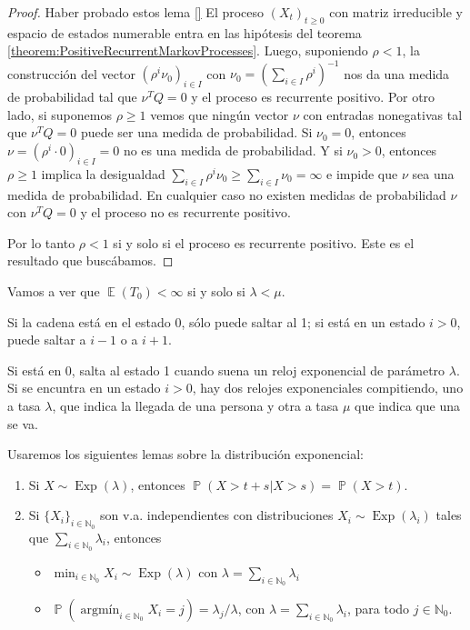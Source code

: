 \documentclass{article}
\DeclareMathOperator{\prob}{\mathbb{P}}
\DeclareMathOperator{\Exp}{\mathbb{E}}
\DeclareMathOperator{\Exponential}{\text{Exp}}
\DeclareMathOperator*{\argmin}{\text{argmín}}
\newcommand{\naturalnum}{\mathbb{N}}
\theoremstyle{definition}
\begin{document}
\begin{proof}
\medskip
Haber probado estos lema \ref{}  El proceso \((X_t)_{t \geq 0}\) con matriz irreducible y espacio de estados numerable entra en las hipótesis del teorema \ref{theorem:PositiveRecurrentMarkovProcesses}.
Luego, suponiendo \(\rho < 1\), la construcción del vector \((\rho^i \nu_0)_{i \in I}\) con \(\nu_0 = \left(\sum_{i \in I} \rho^i\right)^{- 1}\) nos da una medida de probabilidad tal que \(\nu^T Q = 0\) y el proceso es recurrente positivo.
Por otro lado, si suponemos \(\rho \geq 1\) vemos que ningún vector \(\nu\) con entradas nonegativas tal que \(\nu^T Q = 0\) puede ser una medida de probabilidad.
Si \(\nu_0 = 0\), entonces \(\nu = (\rho^i \cdot 0)_{i \in I} = 0\) no es una medida de probabilidad.
Y si \(\nu_0 > 0\), entonces \(\rho \geq 1\) implica la desigualdad \(\sum_{i \in I} \rho^i \nu_0 \geq \sum_{i \in I} \nu_0 = \infty\) e impide que \(\nu\) sea una medida de probabilidad.
En cualquier caso no existen medidas de probabilidad \(\nu\) con \(\nu^T Q = 0\) y el proceso no es recurrente positivo.

Por lo tanto \(\rho < 1\) si y solo si el proceso es recurrente positivo.
Este es el resultado que buscábamos.
\end{proof}




Vamos a ver que \(\Exp(T_0) < \infty\) si y solo si \(\lambda < \mu\).

Si la cadena está en el estado 0, sólo puede saltar al 1; si está en un estado \(i > 0\), puede saltar a \(i - 1\) o a \(i + 1\).

Si está en 0, salta al estado 1 cuando suena un reloj exponencial de parámetro \(\lambda\).
Si se encuntra en un estado \(i > 0\), hay dos relojes exponenciales compitiendo, uno a tasa \(\lambda\), que indica la llegada de una persona y otra a tasa \(\mu\) que indica que una se va. 

Usaremos los siguientes lemas sobre la distribución exponencial:
\begin{enumerate}
	\item Si \(X \sim \Exponential(\lambda)\), entonces \(\prob(X > t + s | X > s) = \prob(X > t)\).
	\item Si \(\{X_i\}_{i \in \naturalnum_0}\) son v.a. independientes con distribuciones \(X_i \sim \Exponential(\lambda_i)\) tales que \(\sum_{i \in \naturalnum_0} \lambda_i\), entonces
	\begin{itemize}
		\item \(\min_{i \in \naturalnum_0} X_i \sim \Exponential(\lambda)\) con \(\lambda = \sum_{i \in \naturalnum_0} \lambda_i\)
		\item \(\prob(\argmin_{i \in \naturalnum_0} X_i = j) = \lambda_j / \lambda\), con \(\lambda = \sum_{i \in \naturalnum_0} \lambda_i\), para todo \(j \in \naturalnum_0\).
	\end{itemize}
\end{enumerate}
\end{document}
